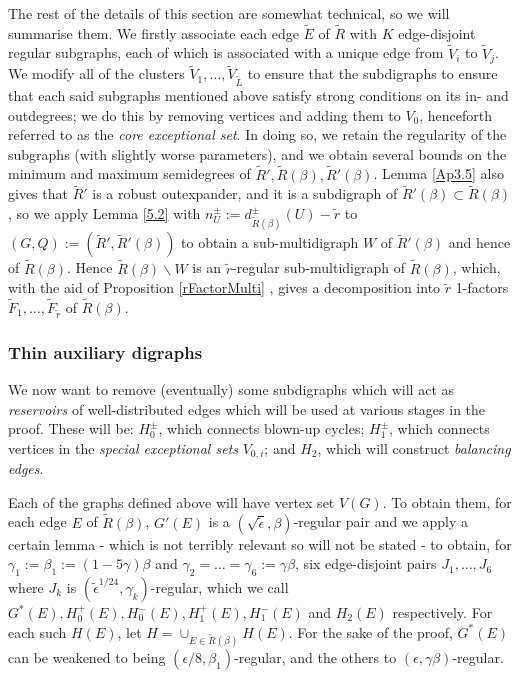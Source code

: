 \documentclass[10pt,letterpaper, reqno]{amsart}
\theoremstyle{definition}
\numberwithin{equation}{section}
\begin{document}
The rest of the details of this section are somewhat technical, so we will summarise them. We firstly associate each edge $\tilde{E}$ of $\tilde{R}$ with $K$ edge-disjoint regular subgraphs, each of which is associated with a unique edge from $\tilde{V}_i$ to $\tilde{V}_j$. We modify all of the clusters $\tilde{V}_1, \dots, \tilde{V}_{\tilde{L}}$ to ensure that the subdigraphs to ensure that each said subgraphs mentioned above satisfy strong conditions on its in- and outdegrees; we do this by removing vertices and adding them to $V_0$, henceforth referred to as the \textit{core exceptional set}. In doing so, we retain the regularity of the subgraphs (with slightly worse parameters), and we obtain several bounds on the minimum and maximum semidegrees of $\tilde{R}', \tilde{R}(\beta), \tilde{R}'(\beta)$. Lemma \ref{Ap3.5} also gives that $\tilde{R}'$ is a robust outexpander, and it is a subdigraph of $\tilde{R}'(\beta) \subset \tilde{R}(\beta)$, so we apply Lemma \ref{5.2} with $n^\pm_U := d^\pm_{\tilde{R}(\beta)}(U) - \tilde{r}$ to $(G,Q) := (\tilde{R}', \tilde{R}'(\beta))$ to obtain a sub-multidigraph $W$ of $\tilde{R}'(\beta)$ and hence of $\tilde{R}(\beta)$. Hence $\tilde{R}(\beta)\backslash W$ is an $\tilde{r}$-regular sub-multidigraph of $\tilde{R}(\beta)$, which, with the aid of Proposition \ref{rFactorMulti} , gives a decomposition into $\tilde{r}$ 1-factors $\tilde{F}_1,\dots, \tilde{F}_{\tilde{r}}$ of $\tilde{R}(\beta)$. 
\subsubsection{Thin auxiliary digraphs} We now want to remove (eventually) some subdigraphs which will act as \textit{reservoirs} of well-distributed edges which will be used at various stages in the proof. These will be: $H_0^\pm$, which connects blown-up cycles; $H_1 ^\pm$, which connects vertices in the \textit{special exceptional sets} $V_{0,i}$; and $H_2$, which will construct \textit{balancing edges}. 

Each of the graphs defined above will have vertex set $V(G)$. To obtain them, for each edge $E$ of $\tilde{R}(\beta)$, $G'(E)$ is a $(\sqrt{\tilde{\epsilon}},\beta)$-regular pair and we apply a certain lemma - which is not terribly relevant so will not be stated - to obtain, for  $\gamma_1 := \beta_1 := (1-5\gamma)\beta$ and $\gamma_2 = \dots = \gamma_6 := \gamma \beta$, six edge-disjoint pairs $J_1, \dots, J_6$ where $J_k$ is $(\tilde{\epsilon}^{1/24},\gamma_k)$-regular, which we call $G^*(E), H_0^+(E), H_0^-(E), H^+_1(E), H^-_1(E)$ and $H_2(E)$ respectively. For each such $H(E)$, let $H = \cup_{E \in \tilde{R}(\beta)}H(E)$. For the sake of the proof, $G^*(E)$ can be weakened to being $(\epsilon/8,\beta_1)$-regular, and the others to $(\epsilon,\gamma\beta)$-regular.
\end{document}
